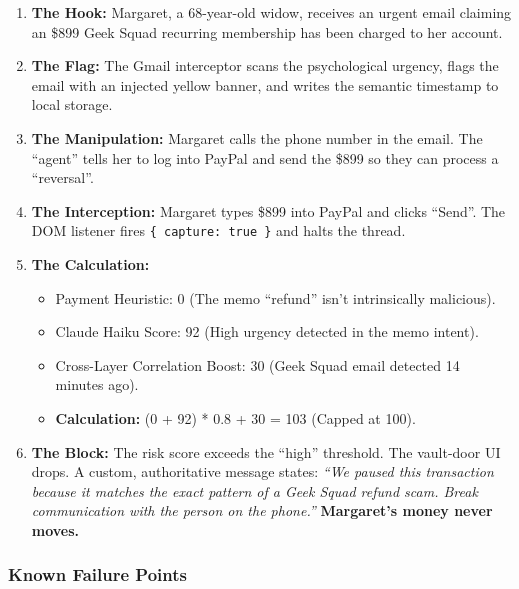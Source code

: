 \documentclass[
]{article}
\providecommand{\tightlist}{%
  \setlength{\itemsep}{0pt}\setlength{\parskip}{0pt}}
\begin{document}
\begin{enumerate}
\def\labelenumi{\arabic{enumi}.}
\tightlist
\item
  \textbf{The Hook:} Margaret, a 68-year-old widow, receives an urgent
  email claiming an \$899 Geek Squad recurring membership has been
  charged to her account.
\item
  \textbf{The Flag:} The Gmail interceptor scans the psychological
  urgency, flags the email with an injected yellow banner, and writes
  the semantic timestamp to local storage.
\item
  \textbf{The Manipulation:} Margaret calls the phone number in the
  email. The ``agent'' tells her to log into PayPal and send the \$899
  so they can process a ``reversal''.
\item
  \textbf{The Interception:} Margaret types \$899 into PayPal and clicks
  ``Send''. The DOM listener fires \texttt{\{\ capture:\ true\ \}} and
  halts the thread.
\item
  \textbf{The Calculation:}

  \begin{itemize}
  \tightlist
  \item
    Payment Heuristic: 0 (The memo ``refund'' isn't intrinsically
    malicious).
  \item
    Claude Haiku Score: 92 (High urgency detected in the memo intent).
  \item
    Cross-Layer Correlation Boost: 30 (Geek Squad email detected 14
    minutes ago).
  \item
    \textbf{Calculation:} (0 + 92) * 0.8 + 30 = 103 (Capped at 100).
  \end{itemize}
\item
  \textbf{The Block:} The risk score exceeds the ``high'' threshold. The
  vault-door UI drops. A custom, authoritative message states:
  \emph{``We paused this transaction because it matches the exact
  pattern of a Geek Squad refund scam. Break communication with the
  person on the phone.''} \textbf{Margaret's money never moves.}
\end{enumerate}

\subsubsection{Known Failure Points}\label{known-failure-points}
\end{document}
